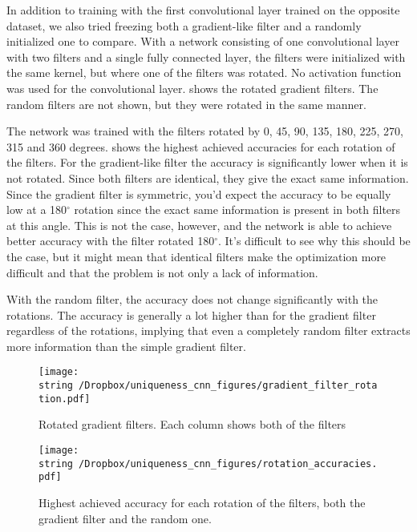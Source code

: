 In addition to training with the first convolutional layer trained on the opposite dataset, we also tried freezing  both a gradient-like filter and a randomly initialized one to compare.
With a network consisting of one convolutional layer with two filters and a single fully connected layer, the filters were initialized with the same kernel, but where one of the filters was rotated.
No activation function was used for the convolutional layer.
 shows the rotated gradient filters.
The random filters are not shown, but they were rotated in the same manner.

The network was trained with the filters rotated by 0, 45, 90, 135, 180, 225, 270, 315 and 360 degrees.
 shows the highest achieved accuracies for each rotation of the filters. For the gradient-like filter the accuracy is significantly lower when it is not rotated. Since both filters are identical, they give the exact same information. Since the gradient filter is symmetric, you'd expect the accuracy to be equally low at a 180$^\circ$ rotation since the exact same information is present in both filters at this angle. This is not the case, however, and the network is able to achieve better accuracy with the filter rotated 180$^\circ$. It's difficult to see why this should be the case, but it might mean that identical filters make the optimization more difficult and that the problem is not only a lack of information.

With the random filter, the accuracy does not change significantly with the rotations. The accuracy is generally a lot higher than for the gradient filter regardless of the rotations, implying that even a completely random filter extracts more information than the simple gradient filter.

\begin{figure}
  \begin{center}
    \texttt{[image: \\string~/Dropbox/uniqueness\_cnn\_figures/gradient\_filter\_rotation.pdf]}
  \end{center}
  \caption{Rotated gradient filters. Each column shows both of the filters }
  \label{fig:rotated_gradient_filter}
\end{figure}

\begin{figure}
  \begin{center}
    \texttt{[image: \\string~/Dropbox/uniqueness\_cnn\_figures/rotation\_accuracies.pdf]}
  \end{center}
  \caption{Highest achieved accuracy for each rotation of the filters, both the gradient filter and the random one.}
  \label{fig:rotated_filter_accuracies}
\end{figure}
